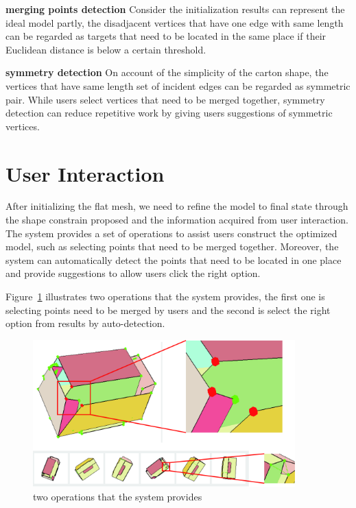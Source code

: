 \documentclass[submission]{gmp2018}
\begin{document}
\noindent
\textbf{merging points detection} Consider the initialization results can represent the ideal model partly, the disadjacent vertices that have one edge with same length can be regarded as targets that need to be located in the same place if their Euclidean distance is below a certain threshold.

\noindent
\textbf{symmetry detection} On account of the simplicity of the carton shape, the vertices that have same length set of incident edges can be regarded as symmetric pair. While users select vertices that need to be merged together, symmetry detection can reduce repetitive work by giving users suggestions of symmetric vertices.


\section{User Interaction}\label{sec:interaction}
After initializing the flat mesh, we need to refine the model to final state through the shape constrain proposed and the information acquired from user interaction. The system provides a set of operations to assist users construct the optimized model, such as selecting points that need to be merged together. Moreover, the system can automatically detect the points that need to be located in one place and provide suggestions to allow users click the right option.

Figure~\ref{fig:interface} illustrates two operations that the system provides, the first one is selecting points need to be merged by users and the second is select the right option from results by auto-detection.   

\begin{figure}
	\centering
	\includegraphics[width=0.9\textwidth]{images/UIdetail.jpg}
	\caption{two operations that the system provides}
	\label{fig:interface}
\end{figure}
\end{document}
